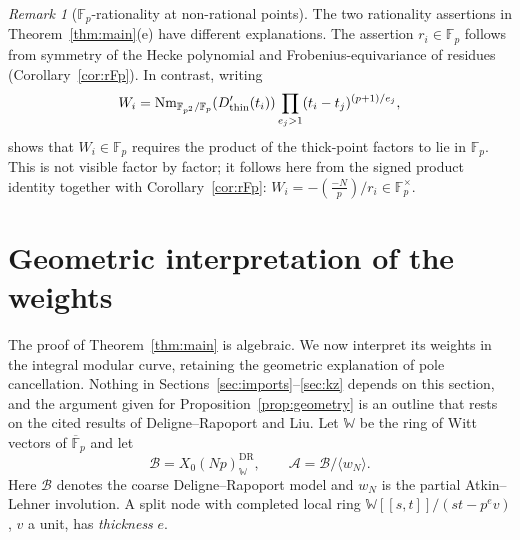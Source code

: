\documentclass[11pt,a4paper]{article}
\numberwithin{equation}{section}
\theoremstyle{definition}
\theoremstyle{remark}
\newtheorem{remark}[theorem]{Remark}
\newcommand{\Fp}{\mathbb F_p}
\newcommand{\Fq}{\mathbb F_{p^2}}
\newcommand{\Fb}{\overline{\mathbb F}_p}
\newcommand{\Lp}[1]{\left(\frac{#1}{p}\right)}
\begin{document}
\begin{remark}[$\Fp$-rationality at non-rational points]
The two rationality assertions in Theorem~\ref{thm:main}(e) have different
explanations. The assertion $r_i\in\Fp$ follows from symmetry of the
Hecke polynomial and Frobenius-equivariance of residues
(Corollary~\ref{cor:rFp}). In contrast, writing
\[
W_i=\operatorname{Nm}_{\Fq/\Fp}(D_{\rm thin}'(t_i))
\prod_{e_j>1}(t_i-t_j)^{(p+1)/e_j},
\]
shows that $W_i\in\Fp$ requires the product of the thick-point factors
to lie in $\Fp$. This is not visible factor by factor; it follows here
from the signed product identity together with Corollary~\ref{cor:rFp}:
$W_i=-\Lp{-N}/r_i\in\Fp^\times$.
\end{remark}


\section{Geometric interpretation of the weights}\label{sec:geometry}
The proof of Theorem~\ref{thm:main} is algebraic. We now interpret its weights in
the integral modular curve, retaining the geometric explanation of pole cancellation.
Nothing in Sections~\ref{sec:imports}--\ref{sec:kz} depends on this section, and the
argument given for Proposition~\ref{prop:geometry} is an outline that rests on the
cited results of Deligne--Rapoport and Liu.
Let $\mathbb W$ be the ring of Witt vectors of $\Fb$ and let
\[
\mathcal B=X_0(Np)^{\mathrm{DR}}_{\mathbb W},\qquad
\mathcal A=\mathcal B/\langle w_N\rangle.
\]
Here $\mathcal B$ denotes the coarse Deligne--Rapoport model and $w_N$ is the
partial Atkin--Lehner involution. A split node with completed local ring
$\mathbb W[[s,t]]/(st-p^ev)$, $v$ a unit, has \emph{thickness} $e$.
\end{document}
